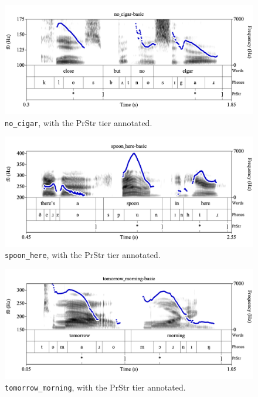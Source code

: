 \documentclass[11pt, twoside]{memoir}
\begin{document}
\begin{figure}[H]
\centering
%
\includegraphics[width=.875\linewidth]{PrStr-no_cigar-basic.png}
%
\caption{\texttt{no\_cigar}, with the PrStr tier annotated.%
\label{fig:no_cigar PrStr}%
%
}
\end{figure}

\begin{figure}[H]
\centering
%
\includegraphics[width=.875\linewidth]{PrStr-spoon_here-basic.png}
%
\caption{\texttt{spoon\_here}, with the PrStr tier annotated.%
\label{fig:spoon_here PrStr}%
%
}
\end{figure}

\begin{figure}[H]
\centering
%
\includegraphics[width=.875\linewidth]{PrStr-tomorrow_morning-basic.png}
%
\caption{\texttt{tomorrow\_morning}, with the PrStr tier annotated.%
\label{fig:tomorrow_morning PrStr}%
%
}
\end{figure}
\end{document}
